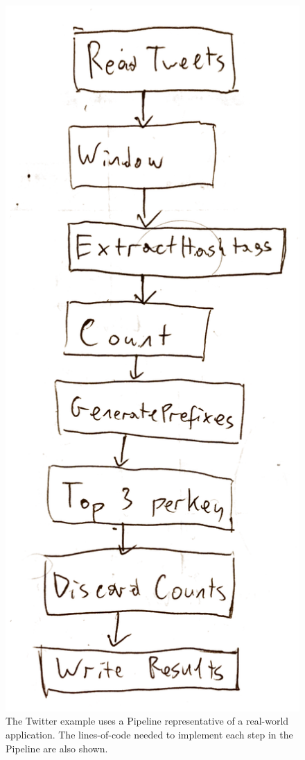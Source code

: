 \begin{figure}
	\centering
	\includegraphics[height=0.5\textheight]{images/temp/eval-twitter-pipeline}
	\caption[The Twitter example Pipeline as a Directed Acyclic Graph.]{The Twitter example uses a Pipeline representative of a real-world application. The lines-of-code needed to implement each step in the Pipeline are also shown.}
	\label{fig:eval:twitter-pipeline-dag}
\end{figure}


